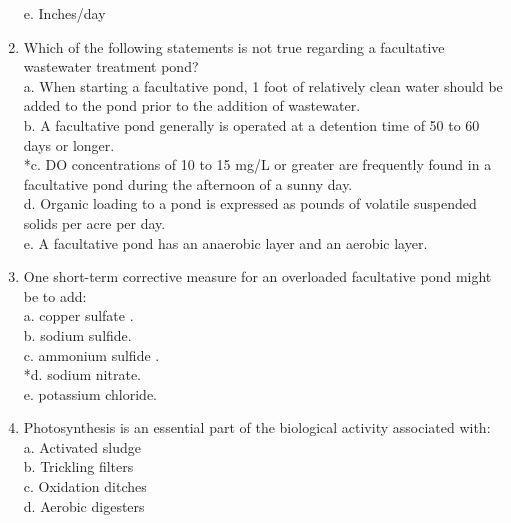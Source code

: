 \begin{enumerate}
e. Inches/day \\


\item  Which of the following statements is not true regarding a facultative wastewater
treatment pond? \\


a. When starting a facultative pond, 1 foot of relatively clean water should be added to the pond prior to the addition of wastewater. \\

b. A facultative pond generally is operated at a detention time of 50 to 60 days or longer. \\

*c. DO concentrations of 10 to 15 mg/L or greater are frequently found in a facultative pond during the afternoon of a sunny day. \\

d. Organic loading to a pond is expressed as pounds of volatile suspended solids per acre per day. \\

e. A facultative pond has an anaerobic layer and an aerobic layer. \\


\item  One short-term corrective measure for an overloaded facultative pond might be to add: \\


a. copper sulfate . \\

b. sodium sulfide. \\

c. ammonium sulfide . \\

*d. sodium nitrate. \\

e. potassium chloride. \\


\item  Photosynthesis is an essential part of the biological activity associated with: \\


a. Activated sludge \\

b. Trickling filters \\

c. Oxidation ditches \\

d. Aerobic digesters \\


\end{enumerate}
